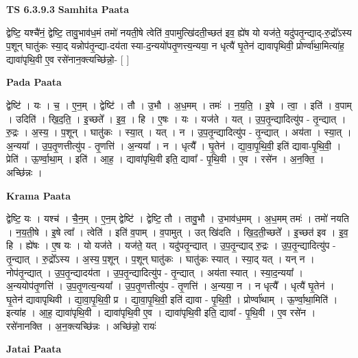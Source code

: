 \documentclass[17pt]{extarticle}
\begin{document}
\textbf{TS 6.3.9.3 } \newline
\textbf{Samhita Paata} \newline

द्वेष्टि॒ यश्चै॑नं॒ द्वेष्टि॒ तावु॒भाव॑ध॒मं तमो॑ नयती॒षे त्वेति॑ व॒पामुत्खि॑दती॒च्छत॑ इव॒ ह्ये॑ष यो यज॑ते॒ यदु॑पतृ॒न्द्याद्-रु॒द्रो᳚ऽस्य प॒शून् घातु॑कः स्या॒द् यन्नोप॑तृ॒न्द्या-दय॑ता स्या-द॒न्ययो॑पतृ॒णत्त्य॒न्यया॒ न धृत्यै॑ घृ॒तेन॑ द्यावापृथिवी॒ प्रोर्ण्वा॑था॒मित्या॑ह॒ द्यावा॑पृथि॒वी ए॒व रसे॑नान॒क्त्यच्छि॑न्नो॒- [  ] \newline

\textbf{Pada Paata} \newline

द्वेष्टि॑ । यः । च॒ । ए॒न॒म् । द्वेष्टि॑ । तौ । उ॒भौ । अ॒ध॒मम् । तमः॑ । न॒य॒ति॒ । इ॒षे । त्वा॒ । इति॑ । व॒पाम् । उदिति॑ । खि॒द॒ति॒ । इ॒च्छते᳚ । इ॒व॒ । हि । ए॒षः । यः । यज॑ते । यत् । उ॒प॒तृ॒न्द्यादित्यु॑प - तृ॒न्द्यात् । रु॒द्रः । अ॒स्य॒ । प॒शून् । घातु॑कः । स्या॒त् । यत् । न । उ॒प॒तृ॒न्द्यादित्यु॑प - तृ॒न्द्यात् । अय॑ता । स्या॒त् । अ॒न्यया᳚ । उ॒प॒तृ॒णत्तीत्यु॑प - तृ॒णत्ति॑ । अ॒न्यया᳚ । न । धृत्यै᳚ । घृ॒तेन॑ । द्या॒वा॒पृ॒थि॒वी॒ इति॑ द्यावा-पृ॒थि॒वी॒ । प्रेति॑ । ऊ॒र्ण्वा॒था॒म् । इति॑ । आ॒ह॒ । द्यावा॑पृथि॒वी इति॒ द्यावा᳚ - पृ॒थि॒वी । ए॒व । रसे॑न । अ॒न॒क्ति॒ । अच्छि॑न्नः ।  \newline


\textbf{Krama Paata} \newline

द्वेष्टि॒ यः । यश्च॑ । चै॒न॒म् । ए॒न॒म् द्वेष्टि॑ । द्वेष्टि॒ तौ । तावु॒भौ । उ॒भाव॑ध॒मम् । अ॒ध॒मम् तमः॑ । तमो॑ नयति । न॒य॒ती॒षे । इ॒षे त्वा᳚ । त्वेति॑ । इति॑ व॒पाम् । व॒पामुत् । उत् खि॑दति । खि॒द॒ती॒च्छते᳚ । इ॒च्छत॑ इव । इ॒व॒ हि । ह्ये॑षः । ए॒ष यः । यो यज॑ते । यज॑ते॒ यत् । यदु॑पतृ॒न्द्यात् । उ॒प॒तृ॒न्द्याद् रु॒द्रः । उ॒प॒तृ॒न्द्यादित्यु॑प - तृ॒न्द्यात् । रु॒द्रो᳚ऽस्य । अ॒स्य॒ प॒शून् । प॒शून् घातु॑कः । घातु॑कः स्यात् । स्या॒द् यत् । यन् न । नोप॑तृ॒न्द्यात् । उ॒प॒तृ॒न्द्यादय॑ता । उ॒प॒तृ॒न्द्यादित्यु॑प - तृ॒न्द्यात् । अय॑ता स्यात् । स्या॒द॒न्यया᳚ । अ॒न्ययोप॑तृ॒णत्ति॑ । उ॒प॒तृ॒णत्य॒न्यया᳚ । उ॒प॒तृ॒णत्तीत्यु॑प - तृ॒णत्ति॑ । अ॒न्यया॒ न । न धृत्यै᳚ । धृत्यै॑ घृ॒तेन॑ । घृ॒तेन॑ द्यावापृथिवी । द्या॒वा॒पृ॒थि॒वी॒ प्र । द्या॒वा॒पृ॒थि॒वी॒ इति॑ द्यावा - पृ॒थि॒वी॒ । प्रोर्ण्वा॑थाम् । ऊ॒र्ण्वा॒था॒मिति॑ । इत्या॑ह । आ॒ह॒ द्यावा॑पृथि॒वी । द्यावा॑पृथि॒वी ए॒व । द्यावा॑पृथि॒वी इति॒ द्यावा᳚ - पृ॒थि॒वी । ए॒व रसे॑न । रसे॑नानक्ति । अ॒न॒क्त्यच्छि॑न्नः । अच्छि॑न्नो॒ रायः॑ \newline

\textbf{Jatai Paata} \newline
\end{document}
